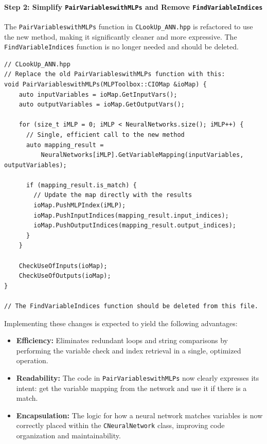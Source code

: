 \documentclass{article}
\begin{document}
\paragraph{Step 2: Simplify \texttt{PairVariableswithMLPs} and Remove \texttt{FindVariableIndices}}

The \texttt{PairVariableswithMLPs} function in \texttt{CLookUp\_ANN.hpp} is refactored to use the new method, making it significantly cleaner and more expressive. The \texttt{FindVariableIndices} function is no longer needed and should be deleted.

\begin{verbatim}
// CLookUp_ANN.hpp
// Replace the old PairVariableswithMLPs function with this:
void PairVariableswithMLPs(MLPToolbox::CIOMap &ioMap) {
    auto inputVariables = ioMap.GetInputVars();
    auto outputVariables = ioMap.GetOutputVars();

    for (size_t iMLP = 0; iMLP < NeuralNetworks.size(); iMLP++) {
      // Single, efficient call to the new method
      auto mapping_result =
          NeuralNetworks[iMLP].GetVariableMapping(inputVariables, outputVariables);

      if (mapping_result.is_match) {
        // Update the map directly with the results
        ioMap.PushMLPIndex(iMLP);
        ioMap.PushInputIndices(mapping_result.input_indices);
        ioMap.PushOutputIndices(mapping_result.output_indices);
      }
    }

    CheckUseOfInputs(ioMap);
    CheckUseOfOutputs(ioMap);
}

// The FindVariableIndices function should be deleted from this file.
\end{verbatim}

Implementing these changes is expected to yield the following advantages:
\begin{itemize}
    \item \textbf{Efficiency:} Eliminates redundant loops and string comparisons by performing the variable check and index retrieval in a single, optimized operation.
    \item \textbf{Readability:} The code in \texttt{PairVariableswithMLPs} now clearly expresses its intent: get the variable mapping from the network and use it if there is a match.
    \item \textbf{Encapsulation:} The logic for how a neural network matches variables is now correctly placed within the \texttt{CNeuralNetwork} class, improving code organization and maintainability.
\end{itemize}
\end{document}
